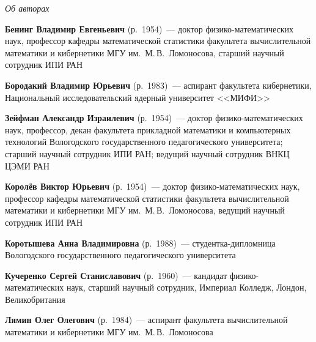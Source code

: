 \begin{center}\LARGE
\textit{Об авторах}
\end{center}
\thispagestyle{empty}

\vspace*{24pt}

\begin{multicols}{2}


\noindent
\textbf{Бенинг Владимир Евгеньевич} (р.\ 1954)~---  доктор физико-математических наук, 
профессор ка\-фед\-ры математической статистики факультета вы\-чис\-ли\-тель\-ной 
математики  и кибернетики МГУ им.\ М.\,В.~Ломоносова, старший научный сотрудник 
ИПИ РАН

\vspace*{6pt}

\noindent
\textbf{Бородакий Владимир Юрьевич} (р.\ 1983)~--- аспирант факультета кибернетики,
Национальный исследовательский ядерный университет <<МИФИ>>

\vspace*{6pt}

\noindent
\textbf{Зейфман Александр Израилевич} (р.\ 1954)~--- доктор
физико-математических наук, профессор, декан факультета прикладной
математики и компьютерных технологий Вологодского государственного
педагогического университета; старший научный сотрудник ИПИ РАН;
ведущий научный сотрудник ВНКЦ ЦЭМИ РАН

\vspace*{6pt}

\noindent
\textbf{Королёв Виктор Юрьевич} (р.\ 1954)~---  доктор физико-математических наук, 
профессор кафедры математической статистики факультета вычислительной математики 
и кибернетики МГУ им.\ М.\,В.~Ломоносова, 
ведущий научный сотрудник ИПИ РАН


\vspace*{6pt}

\noindent
\textbf{Коротышева Анна Владимировна} (р.\ 1988)~--- студентка-дипломница Вологодского государственного
педагогического университета

\vspace*{6pt}

\noindent
\textbf{Кучеренко Сергей Станиславович} (р.\ 1960)~--- кандидат физико-математических наук, старший
научный сотрудник, Империал Колледж,  Лондон, Великобритания

\vspace*{6pt}


\noindent
\textbf{Лямин Олег Олегович} (р.\ 1984)~--- аспирант факультета вычислительной математики 
и кибернетики МГУ им.\ М.\,В.~Ломоносова
\vspace*{6pt}


\end{multicols}

